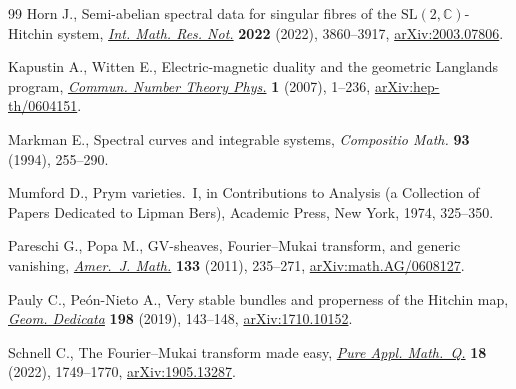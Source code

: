 \documentclass[pdftex]{sigma}
\numberwithin{equation}{section}
\theoremstyle{definition}
\begin{document}
\begin{thebibliography}{99}
Horn J., Semi-abelian spectral data for singular fibres of the
 {$\mathrm{SL}(2,\mathbb C)$}-{H}itchin system,
 \href{https://doi.org/10.1093/imrn/rnaa273}{\textit{Int. Math. Res. Not.}}
 \textbf{2022} (2022), 3860--3917,
 \href{http://arxiv.org/abs/2003.07806}{arXiv:2003.07806}.

Kapustin A., Witten E., Electric-magnetic duality and the geometric {L}anglands
 program, \href{https://doi.org/10.4310/CNTP.2007.v1.n1.a1}{\textit{Commun.
 Number Theory Phys.}} \textbf{1} (2007), 1--236,
 \href{http://arxiv.org/abs/hep-th/0604151}{arXiv:hep-th/0604151}.

Markman E., Spectral curves and integrable systems, \textit{Compositio Math.}
 \textbf{93} (1994), 255--290.

Mumford D., Prym varieties.~{I}, in Contributions to Analysis (a Collection of
 Papers Dedicated to {L}ipman {B}ers), Academic Press, New York, 1974,
 325--350.

Pareschi G., Popa M., G{V}-sheaves, {F}ourier--{M}ukai transform, and generic
 vanishing, \href{https://doi.org/10.1353/ajm.2011.0000}{\textit{Amer.~J.
 Math.}} \textbf{133} (2011), 235--271,
 \href{http://arxiv.org/abs/math.AG/0608127}{arXiv:math.AG/0608127}.

Pauly C., Pe\'{o}n-Nieto A., Very stable bundles and properness of the
 {H}itchin map, \href{https://doi.org/10.1007/s10711-018-0333-6}{\textit{Geom.
 Dedicata}} \textbf{198} (2019), 143--148,
 \href{http://arxiv.org/abs/1710.10152}{arXiv:1710.10152}.

Schnell C., The {F}ourier--{M}ukai transform made easy,
 \href{https://doi.org/10.4310/pamq.2022.v18.n4.a14}{\textit{Pure Appl.
 Math.~Q.}} \textbf{18} (2022), 1749--1770,
 \href{http://arxiv.org/abs/1905.13287}{arXiv:1905.13287}.

\end{thebibliography}\LastPageEnding
\end{document}
